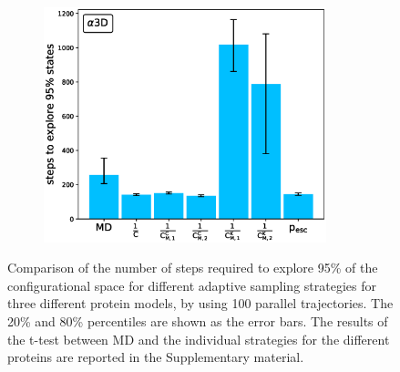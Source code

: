 \begin{figure}[!hbt]
\begin{subfigure}[t]{0.5\textwidth}
    \includegraphics[width=0.9\textwidth]{figures/A3D_7_steps10000_nparallel100_explore.eps}
  \end{subfigure}
  \caption{Comparison of the number of steps required to explore 95\% of the
  configurational space for different adaptive sampling strategies for three
  different protein models, by using 100 parallel trajectories. The 20\% and
  80\% percentiles are shown as the error bars.
  The results of the t-test between MD and the
  individual strategies for the different proteins are reported in the Supplementary material.}
  \label{fig:Time_explore}
\end{figure}

